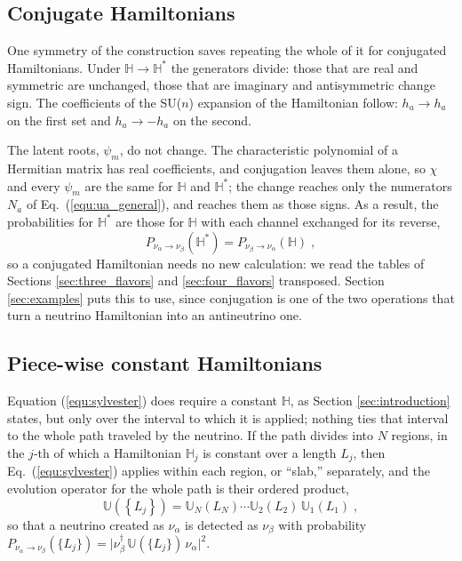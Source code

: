 \documentclass[final,5p,times,twocolumn,sort,compress]{elsarticle}
\newcommand{\eq}{Eq.}
\newcommand{\equ}[1]{\eq~(\ref{equ:#1})}
\begin{document}

\subsection{Conjugate Hamiltonians}
\label{sec:conjugation}

One symmetry of the construction saves repeating the whole of it for conjugated Hamiltonians.  Under $\mathbb{H} \to \mathbb{H}^\ast$ the generators divide: those that are real and symmetric are unchanged, those that are imaginary and antisymmetric change sign.  The coefficients of the SU($n$) expansion of the Hamiltonian follow: $h_a \to h_a$ on the first set and $h_a \to -h_a$ on the second.

The latent roots, $\psi_m$, do not change.  The characteristic polynomial of a Hermitian matrix has real coefficients, and conjugation leaves them alone, so $\chi$ and every $\psi_m$ are the same for $\mathbb{H}$ and $\mathbb{H}^\ast$; the change reaches only the numerators $N_a$ of \equ{ua_general}, and reaches them as those signs.  As a result, the probabilities for $\mathbb{H}^\ast$ are those for $\mathbb{H}$ with each channel exchanged for its reverse,
\begin{equation}
 \label{equ:conjugation}
 P_{\nu_\alpha \to \nu_\beta}\!\left(\mathbb{H}^\ast\right)
 =
 P_{\nu_\beta \to \nu_\alpha}\!\left(\mathbb{H}\right) \;,
\end{equation}
so a conjugated Hamiltonian needs no new calculation: we read the tables of Sections \ref{sec:three_flavors} and \ref{sec:four_flavors} transposed.  Section \ref{sec:examples} puts this to use, since conjugation is one of the two operations that turn a neutrino Hamiltonian into an antineutrino one.


\subsection{Piece-wise constant Hamiltonians}
\label{sec:composition}

Equation (\ref{equ:sylvester}) does require a constant $\mathbb{H}$, as Section \ref{sec:introduction} states, but only over the interval to which it is applied; nothing ties that interval to the whole path traveled by the neutrino.  If the path divides into $N$ regions, in the $j$-th of which a Hamiltonian $\mathbb{H}_j$ is constant over a length $L_j$, then \equ{sylvester} applies within each region, or ``slab,'' separately, and the evolution operator for the whole path is their ordered product,
\begin{equation}
 \label{equ:composition}
 \mathbb{U}\left(\left\{L_j\right\}\right)
 =
 \mathbb{U}_N\left(L_N\right) \cdots
 \mathbb{U}_2\left(L_2\right) \,
 \mathbb{U}_1\left(L_1\right) \;,
\end{equation}
so that a neutrino created as $\nu_\alpha$ is detected as $\nu_\beta$ with probability $P_{\nu_\alpha \to \nu_\beta}(\{L_j\}) = \lvert \nu_\beta^\dagger \, \mathbb{U}(\{L_j\}) \, \nu_\alpha \rvert^2$.  
\end{document}
